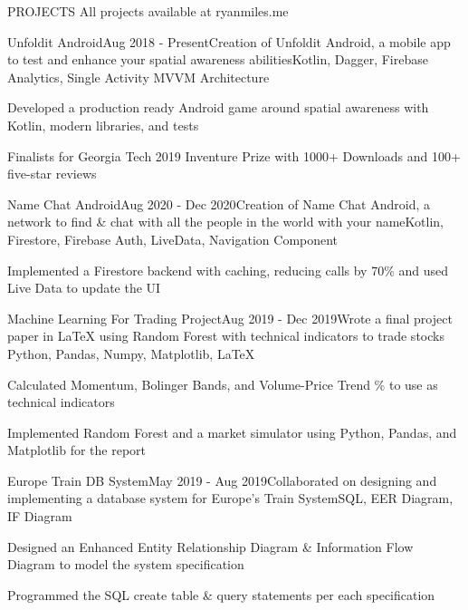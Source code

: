 \documentclass{resume} %
\begin{document}
\vspace{.3em}


\begin{rSectionProjects}{PROJECTS} {All projects available at ryanmiles.me}
	
	\begin{rSubsectionProjects}{Unfoldit Android}{Aug 2018 - Present}{Creation of Unfoldit Android, a mobile app to test and enhance your spatial awareness abilities}{Kotlin, Dagger, Firebase Analytics, Single Activity MVVM Architecture}
		\item Developed a production ready Android game around spatial awareness with Kotlin, modern libraries, and tests
		\item Finalists for Georgia Tech 2019 Inventure Prize with 1000+ Downloads and 100+ five-star reviews
		
	\end{rSubsectionProjects} 

\begin{rSubsectionProjects}{Name Chat Android}{Aug 2020 - Dec 2020}{Creation of Name Chat Android, a network to find \& chat with all the people in the world with your name}{Kotlin, Firestore, Firebase Auth, LiveData, Navigation Component}{}
	\item Implemented a Firestore backend with caching, reducing calls by 70\% and used Live Data to update the UI
\end{rSubsectionProjects}

\begin{rSubsectionProjects}{Machine Learning For Trading Project}{Aug 2019 - Dec 2019}{Wrote a final project paper in LaTeX using Random Forest with technical indicators to trade stocks }{Python, Pandas, Numpy, Matplotlib, LaTeX} {}
	\item Calculated Momentum, Bolinger Bands, and Volume-Price Trend \% to use as technical indicators
	\item Implemented Random Forest and a market simulator using Python, Pandas, and Matplotlib for the report	
\end{rSubsectionProjects} 


\begin{rSubsectionProjects}{Europe Train DB System}{May 2019 - Aug 2019}{Collaborated on designing and implementing a database system for Europe's Train System}{SQL, EER Diagram, IF Diagram} {}
	\item Designed an Enhanced Entity Relationship Diagram \& Information Flow Diagram to model the system specification
	\item Programmed the SQL create table  \& query statements per each specification
	

\end{rSubsectionProjects}
\end{rSectionProjects}
\end{document}
